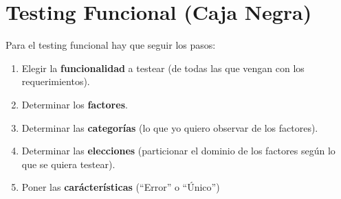 \section{Testing Funcional (Caja Negra)}

Para el testing funcional hay que seguir los pasos:

\begin{enumerate}
 \item Elegir la \textbf{funcionalidad} a testear (de todas las que vengan con los requerimientos).
 \item Determinar los \textbf{factores}.
 \item Determinar las \textbf{categor\'ias} (lo que yo quiero observar de los factores). 
 \item Determinar las \textbf{elecciones} (particionar el dominio de los factores seg\'un lo que se quiera testear). 
 \item Poner las \textbf{car\'acter\'isticas} (``Error'' o ``\'Unico'')
\end{enumerate}
